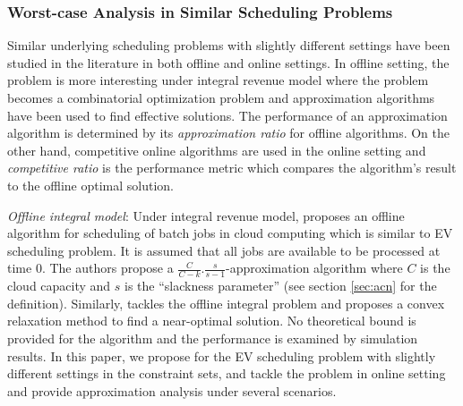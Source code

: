 \subsubsection{Worst-case Analysis in Similar Scheduling Problems}
\label{sec:rel:comp}
	Similar underlying scheduling problems with slightly different settings have been studied in the literature in both offline and online settings. In offline setting, the problem is more interesting under integral revenue model where the problem becomes a combinatorial optimization problem and approximation algorithms have been used to find effective solutions. 
The performance of an approximation algorithm is determined by its \emph{approximation ratio} for offline 
algorithms. On the other hand, competitive online algorithms are used in the online setting and \emph{competitive ratio} is the performance metric which compares the algorithm's result to the offline optimal solution. 

\textit{Offline integral model}: Under integral revenue model, \cite{Jain} proposes an offline algorithm for scheduling of batch jobs in cloud computing which is similar to EV scheduling problem. It is assumed that all jobs are available to be processed at time 0. The authors propose a $\frac{C}{C-k}.\frac{s}{s-1}$-approximation algorithm where $C$ is the cloud capacity and $s$ is the ``slackness parameter'' (see section \ref{sec:acn} for the definition). 
Similarly, \cite{yao2016real} tackles the offline integral problem and proposes a convex relaxation method to find a near-optimal solution. No theoretical bound is provided for the algorithm and the performance is examined by simulation results. In this paper, we propose \ics for the EV scheduling problem with slightly different settings in the constraint sets, and tackle the problem in online setting and provide approximation analysis under several scenarios. 


